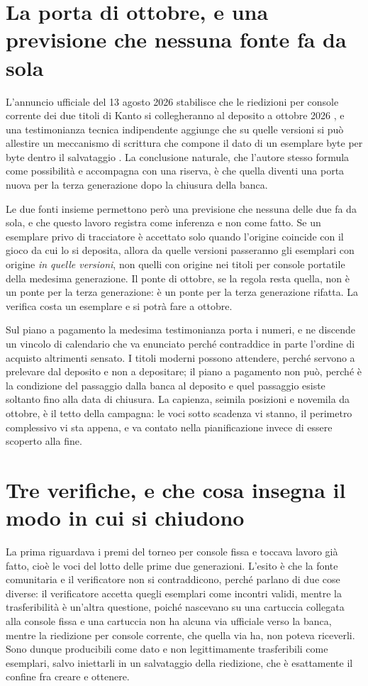 \section{La porta di ottobre, e una previsione che nessuna fonte fa da sola}

L'annuncio ufficiale del 13 agosto 2026 stabilisce che le riedizioni per console corrente dei due titoli di Kanto si collegheranno al deposito a ottobre 2026 \cite{frlg-home}, e una testimonianza tecnica indipendente aggiunge che su quelle versioni si può allestire un meccanismo di scrittura che compone il dato di un esemplare byte per byte dentro il salvataggio \cite{mankeymite-home}. La conclusione naturale, che l'autore stesso formula come possibilità e accompagna con una riserva, è che quella diventi una porta nuova per la terza generazione dopo la chiusura della banca.

Le due fonti insieme permettono però una previsione che nessuna delle due fa da sola, e che questo lavoro registra come inferenza e non come fatto. Se un esemplare privo di tracciatore è accettato solo quando l'origine coincide con il gioco da cui lo si deposita, allora da quelle versioni passeranno gli esemplari con origine \emph{in quelle versioni}, non quelli con origine nei titoli per console portatile della medesima generazione. Il ponte di ottobre, se la regola resta quella, non è un ponte per la terza generazione: è un ponte per la terza generazione rifatta. La verifica costa un esemplare e si potrà fare a ottobre.

Sul piano a pagamento la medesima testimonianza porta i numeri, e ne discende un vincolo di calendario che va enunciato perché contraddice in parte l'ordine di acquisto altrimenti sensato. I titoli moderni possono attendere, perché servono a prelevare dal deposito e non a depositare; il piano a pagamento non può, perché è la condizione del passaggio dalla banca al deposito e quel passaggio esiste soltanto fino alla data di chiusura. La capienza, seimila posizioni e novemila da ottobre, è il tetto della campagna: le voci sotto scadenza vi stanno, il perimetro complessivo vi sta appena, e va contato nella pianificazione invece di essere scoperto alla fine.

\section{Tre verifiche, e che cosa insegna il modo in cui si chiudono}

La prima riguardava i premi del torneo per console fissa e toccava lavoro già fatto, cioè le voci del lotto delle prime due generazioni. L'esito è che la fonte comunitaria e il verificatore non si contraddicono, perché parlano di due cose diverse: il verificatore accetta quegli esemplari come incontri validi, mentre la trasferibilità è un'altra questione, poiché nascevano su una cartuccia collegata alla console fissa e una cartuccia non ha alcuna via ufficiale verso la banca, mentre la riedizione per console corrente, che quella via ha, non poteva riceverli. Sono dunque producibili come dato e non legittimamente trasferibili come esemplari, salvo iniettarli in un salvataggio della riedizione, che è esattamente il confine fra creare e ottenere.

